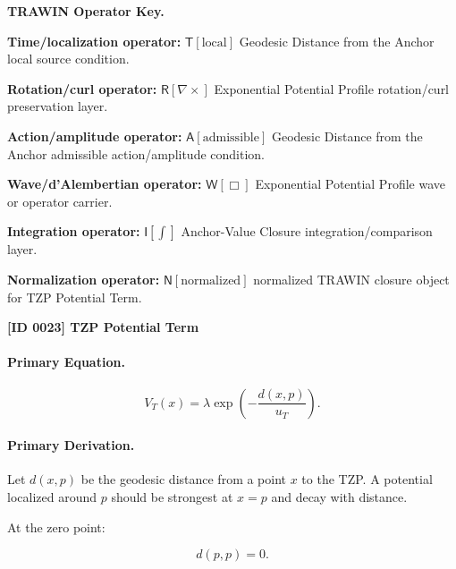 \par\vspace{0.45\baselineskip}
\noindent\begin{minipage}[t]{\linewidth}
\begingroup
\small
\raggedright
\textbf{TRAWIN Operator Key.}\par
\noindent\textbf{Time/localization operator:} $\mathsf{T}\!\left[\mathrm{local}\right]$ Geodesic Distance from the Anchor local source condition.\par
\noindent\textbf{Rotation/curl operator:} $\mathsf{R}\!\left[\nabla\times\right]$ Exponential Potential Profile rotation/curl preservation layer.\par
\noindent\textbf{Action/amplitude operator:} $\mathsf{A}\!\left[\mathrm{admissible}\right]$ Geodesic Distance from the Anchor admissible action/amplitude condition.\par
\noindent\textbf{Wave/d'Alembertian operator:} $\mathsf{W}\!\left[\Box\right]$ Exponential Potential Profile wave or operator carrier.\par
\noindent\textbf{Integration operator:} $\mathsf{I}\!\left[\int\right]$ Anchor-Value Closure integration/comparison layer.\par
\noindent\textbf{Normalization operator:} $\mathsf{N}\!\left[\mathrm{normalized}\right]$ normalized TRAWIN closure object for TZP Potential Term.\par
\endgroup
\end{minipage}

\clearpage
\noindent\textbf{[ID 0023] TZP Potential Term}\par
\vspace{0.35em}
\paragraph{Primary Equation.}
\begin{equation}
V_T(x)
=
\lambda
\exp\left(
-\frac{d(x,p)}{u_T}
\right).
\end{equation}

\paragraph{Primary Derivation.}
Let $d(x,p)$ be the geodesic distance from a point $x$ to the TZP.  
A potential localized around $p$ should be strongest at $x=p$ and decay with distance.

At the zero point:

\begin{equation}
d(p,p)=0 .
\end{equation}

